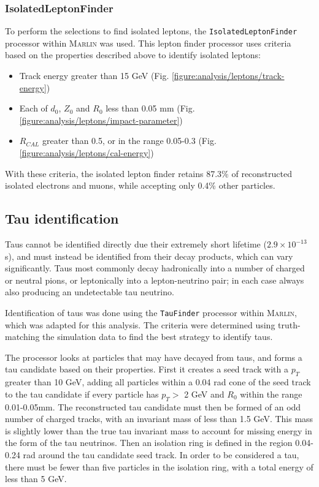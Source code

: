 \subsubsection{IsolatedLeptonFinder}
To perform the selections to find isolated leptons, the \texttt{IsolatedLeptonFinder} processor within \textsc{Marlin} was used. This lepton finder processor uses criteria based on the properties described above to identify isolated leptons:

\begin{itemize}
	\item Track energy greater than 15 GeV (Fig. \ref{figure:analysis/leptons/track-energy})
	\item Each of $d_0$, $Z_0$ and $R_0$ less than 0.05 mm (Fig. \ref{figure:analysis/leptons/impact-parameter})
	\item $R_{CAL}$ greater than 0.5, or in the range 0.05-0.3 (Fig. \ref{figure:analysis/leptons/cal-energy})
\end{itemize}

With these criteria, the isolated lepton finder retains 87.3\% of reconstructed isolated electrons and muons, while accepting only 0.4\% other particles.

\subsection{Tau identification}
Taus cannot be identified directly due their extremely short lifetime ($2.9 \times 10^{-13}$s), and must instead be identified from their decay products, which can vary significantly. Taus most commonly decay hadronically into a number of charged or neutral pions, or leptonically into a lepton-neutrino pair; in each case always also producing an undetectable tau neutrino. 

Identification of taus was done using the \texttt{TauFinder} processor\cite{taufinder} within \textsc{Marlin}, which was adapted for this analysis. The criteria were determined using truth-matching the simulation data to find the best strategy to identify taus.

The processor looks at particles that may have decayed from taus, and forms a tau candidate based on their properties. First it creates a seed track with a $p_T$ greater than 10 GeV, adding all particles within a 0.04 rad cone of the seed track to the tau candidate if every particle has $p_T >$ 2 GeV and $R_0$ within the range 0.01-0.05mm. The reconstructed tau candidate must then be formed of an odd number of charged tracks, with an invariant mass of less than 1.5 GeV. This mass is slightly lower than the true tau invariant mass to account for missing energy in the form of the tau neutrinos. Then an isolation ring is defined in the region 0.04-0.24 rad around the tau candidate seed track. In order to be considered a tau, there must be fewer than five particles in the isolation ring, with a total energy of less than 5 GeV.


